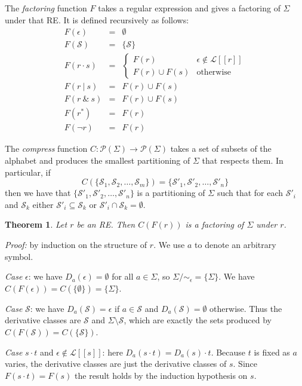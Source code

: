 \documentclass[11pt]{article}
\newcommand{\RE}{r}
\newcommand{\OR}{\ | \ }
\newcommand{\AND}{\ \& \ }
\newcommand{\CL}{\mathcal{L}}
\newcommand{\CS}{\mathcal{S}}
\newcommand{\CP}{\mathcal{P}}
\newcommand{\Sem}[1]{[ \! [ #1 ] \! ]}
\newcommand{\Ls}[1]{\CL\Sem{#1}}
\newtheorem*{theorem}{Theorem}
\begin{document}
The \emph{factoring} function $F$ takes a regular expression and gives a factoring of $\Sigma$ under that RE.  It is defined recursively as follows:
\begin{eqnarray*}
F(\epsilon)     &=& \emptyset \\
F(\CS)          &=& \{ \CS \} \\
F(r \cdot s)    &=&
    \begin{cases}
        F(r) & \epsilon \notin \Ls{r} \\
        F(r) \cup F(s) & \textrm{otherwise}
    \end{cases} \\
F(r \OR s)      &=& F(r) \cup F(s) \\
F(r \AND s)     &=& F(r) \cup F(s) \\
F(r^*)          &=& F(r) \\
F(\neg r)       &=& F(r)
\end{eqnarray*}

The \emph{compress} function $C : \CP(\Sigma) \longrightarrow \CP(\Sigma)$ takes a set of subsets of the alphabet and produces the smallest partitioning of $\Sigma$ that respects them.  In particular, if
\[ C(\{\CS_1, \CS_2, \dots, \CS_m \}) = \{ \CS'_1, \CS'_2, \dots, \CS'_n \} \]
then we have that $\{ \CS'_1, \CS'_2, \dots, \CS'_n \}$ is a partitioning of $\Sigma$ such that for each $\CS'_i$ and $\CS_k$ either $\CS'_i \subseteq \CS_k$ or $\CS'_i \cap \CS_k = \emptyset$.

\begin{theorem}  Let $\RE$ be an RE.  Then $C(F(r))$ is a factoring of $\Sigma$ under $\RE$.
\end{theorem}

\emph{Proof:} by induction on the structure of $\RE$.  We use $a$ to denote an arbitrary symbol.

\vskip 5pt
\emph{Case} $\epsilon$: we have $D_a(\epsilon) = \emptyset$ for all $a \in \Sigma$, so $\Sigma/{\sim_\epsilon} = \{ \Sigma \}$.  We have $C(F(\epsilon)) = C(\{ \emptyset \})= \{ \Sigma \}$.

\vskip 5pt
\emph{Case} $\CS$: we have $D_a(\CS) = \epsilon$ if $a \in \CS$ and $D_a(\CS) = \emptyset$ otherwise. Thus the derivative classes are $\CS$ and $\Sigma \setminus \CS$, which are exactly the sets produced by $C(F(\CS)) = C(\{ \CS \})$.

\vskip 5pt
\emph{Case} $s \cdot t$ and $\epsilon \notin \Ls{s}$:  here $D_a(s \cdot t) = D_a(s) \cdot t$. Because $t$ is fixed as $a$ varies, the derivative classes are just the derivative classes of $s$.  Since $F(s \cdot t) = F(s)$ the result holds by the induction hypothesis on $s$.
\end{document}
